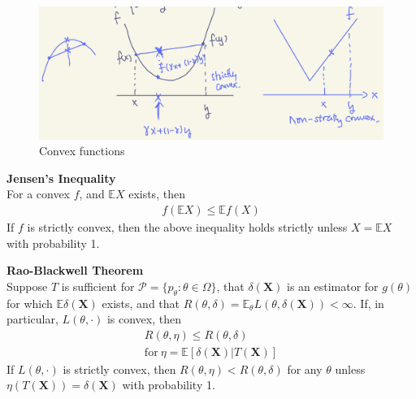\begin{figure}[htpb]
    \centering
    \includegraphics[width=\textwidth]{figures/convex.png}
    \caption{Convex functions}
    \label{fig:convex}
\end{figure}

\begin{theorem}
    \textbf{Jensen's Inequality}\\
    For a convex $f$, and $\mathbb{E}X$ exists, then
    \begin{gather}
        f(\mathbb{E}X)\leq\mathbb{E}f(X)
    \end{gather}
    If $f$ is strictly convex, then the above inequality holds strictly unless 
    $X=\mathbb{E}X$ with probability 1.
\end{theorem}


\begin{theorem}\label{thm:raoblackwell}
    \textbf{Rao-Blackwell Theorem}\\
    Suppose $T$ is sufficient for $\mathcal{P}=\{p_\theta: \theta\in\Omega\}$,
    that $\delta(\boldsymbol{X})$ is an estimator for $g(\theta)$ for which $\mathbb{E}\delta(\boldsymbol{X})$ exists,
    and that $R(\theta,\delta)=\mathbb{E}_\theta L(\theta,\delta(\boldsymbol{X}))<\infty$.
    If, in particular, $L(\theta,\cdot)$ is convex, then
    \begin{gather}
        R(\theta, \eta)\leq R(\theta,\delta)\\
        \text{for}~\eta=\mathbb{E}[\delta(\boldsymbol{X})|T(\boldsymbol{X})]
    \end{gather}
    If $L(\theta,\cdot)$ is strictly convex, then $R(\theta,\eta)<R(\theta,\delta)$
    for any $\theta$ unless $\eta(T(\boldsymbol{X}))=\delta(\boldsymbol{X})$ with probability 1.
\end{theorem}


